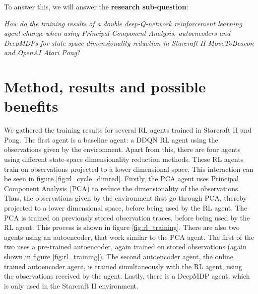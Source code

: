 \noindent To answer this, we will answer the \textbf{research sub-question}:\newline

\noindent \textit{How do the training results of a double deep-Q-network reinforcement learning agent change when using Principal Component Analysis, autoencoders and DeepMDPs for state-space dimensionality reduction in Starcraft II MoveToBeacon and OpenAI Atari Pong}?

\section{Method, results and possible benefits}
We gathered the training results for several RL agents trained in Starcraft II and Pong. The first agent is a baseline agent: a DDQN RL agent using the observations given by the environment. Apart from this, there are four agents using different state-space dimensionality reduction methods. These RL agents train on observations projected to a lower dimensional space. This interaction can be seen in figure \ref{fig:rl_cycle_dimred}. Firstly, the PCA agent uses Principal Component Analysis (PCA) to reduce the dimensionality of the observations. Thus, the observations given by the environment first go through PCA, thereby projected to a lower dimensional space, before being used by the RL agent. The PCA is trained on previously stored observation traces, before being used by the RL agent. This process is shown in figure \ref{fig:rl_training}. There are also two agents using an autoencoder, that work similar to the PCA agent. The first of the two uses a pre-trained autoencoder, again trained on stored observations (again shown in figure \ref{fig:rl_training}). The second autoencoder agent, the online trained autoencoder agent, is trained simultaneously with the RL agent, using the observations received by the agent. Lastly, there is a DeepMDP agent, which is only used in the Starcraft II environment.

